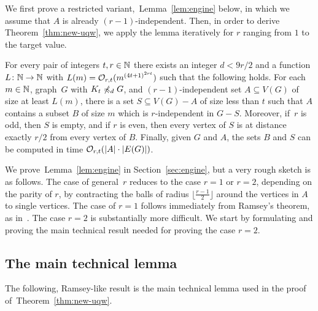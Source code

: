 We first prove a restricted variant,~Lemma~\ref{lem:engine} below, in
which we assume that $A$ is already $(r-1)$-independent. Then, in
order to derive Theorem~\ref{thm:new-uqw}, we apply the lemma
iteratively for $r$ ranging from $1$ to the target value.

\vspace{-1mm}
\begin{lemma}\label{lem:engine}
  For every pair of integers $t,r\in \mathbb{N}$ there exists an integer
  $d<9r/2$ and a function $L\colon \mathbb{N}\to \mathbb{N}$ with
  $L(m)=\mathcal{O}_{r,t}{(m^{{(4t+1)}^{2rt}})}$ such that the following
  holds.  For each $m\in \mathbb{N}$, graph~$G$ with $K_t\not\preccurlyeq_{d} G$,
  and $(r-1)$-independent set $A\subseteq V(G)$ of size at least
  $L(m)$, there is a set $S\subseteq V(G)-A$ of size less than $t$
  such that $A$ contains a subset $B$ of size $m$ which is
  $r$-independent in $G-S$.  Moreover, if~$r$ is odd, then $S$ is
  empty, and if $r$ is even, then every vertex of $S$ is at distance
  exactly $r/2$ from every vertex of $B$.  Finally, given $G$ and $A$,
  the sets $B$ and $S$ can be computed in time
  $\mathcal{O}_{r,t}(|A|\cdot |E(G)|)$.
\end{lemma}

We prove~Lemma~\ref{lem:engine} in Section~\ref{sec:engine}, but a
very rough sketch is as follows.  The case of general~$r$ reduces to
the case $r=1$ or $r=2$, depending on the parity of $r$, by
contracting the balls of radius $\lfloor \frac {r-1} 2\rfloor $ around
the vertices in $A$ to single vertices.  The case of $r=1$ follows
immediately from Ramsey's theorem, as in~\cite{nevsetvril2011nowhere}.
The case $r=2$ is substantially more difficult.  We start by
formulating and proving the main technical result needed for proving
the case $r=2$.







\subsection{The main technical lemma}
\label{sec:main-tech}

The following, Ramsey-like result is the main technical lemma used in
the proof of~Theorem~\ref{thm:new-uqw}.

